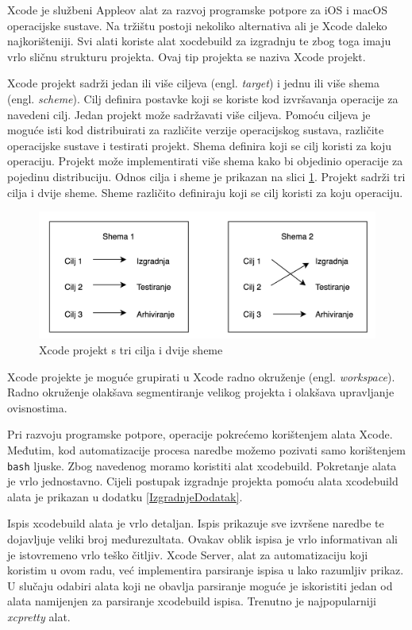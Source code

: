 \documentclass[times, utf8, diplomski, numeric]{fer}
\newcommand{\eng}[1]{(engl. \textit{#1})}
\begin{document}
Xcode je službeni Appleov alat za razvoj programske potpore za iOS i macOS operacijske sustave. Na tržištu postoji nekoliko alternativa ali je Xcode daleko najkorišteniji. Svi alati koriste alat xocdebuild za izgradnju te zbog toga imaju vrlo sličnu strukturu projekta. Ovaj tip projekta se naziva Xcode projekt.

Xcode projekt sadrži jedan ili više ciljeva \eng{target} i jednu ili više shema \eng{scheme}. Cilj definira postavke koji se koriste kod izvršavanja operacije za navedeni cilj.  Jedan projekt može sadržavati više ciljeva. Pomoću ciljeva je moguće isti kod distribuirati za različite verzije operacijskog sustava, različite operacijske sustave i testirati projekt. Shema definira koji se cilj koristi za koju operaciju. Projekt može implementirati više shema kako bi objedinio operacije za pojedinu distribuciju. Odnos cilja i sheme je prikazan na slici \ref{fig:TargetScheme}. Projekt sadrži tri cilja i dvije sheme. Sheme različito definiraju koji se cilj koristi za koju operaciju.

\begin{figure}
\centering
\includegraphics[scale=0.5]{TargetScheme}
\caption{Xcode projekt s tri cilja i dvije sheme}
\label{fig:TargetScheme}
\end{figure}

Xcode projekte je moguće grupirati u Xcode radno okruženje \eng{workspace}. Radno okruženje olakšava segmentiranje velikog projekta i olakšava upravljanje ovisnostima.

Pri razvoju programske potpore, operacije pokrećemo korištenjem alata Xcode. Međutim, kod automatizacije procesa naredbe možemo pozivati samo korištenjem \verb|bash| ljuske. Zbog navedenog moramo koristiti alat xcodebuild. Pokretanje alata je vrlo jednostavno. Cijeli postupak izgradnje projekta pomoću alata xcodebuild alata je prikazan u dodatku \ref{IzgradnjeDodatak}.

Ispis xcodebuild alata je vrlo detaljan. Ispis prikazuje sve izvršene naredbe te dojavljuje veliki broj međurezultata. Ovakav oblik ispisa je vrlo informativan ali je istovremeno vrlo teško čitljiv. Xcode Server, alat za automatizaciju koji koristim u ovom radu, već implementira parsiranje ispisa u lako razumljiv prikaz. U slučaju odabiri alata koji ne obavlja parsiranje  moguće je iskoristiti jedan od alata namijenjen za parsiranje xcodebuild ispisa. Trenutno je najpopularniji \textit{xcpretty} alat\citep{xcpretty}.
\end{document}
